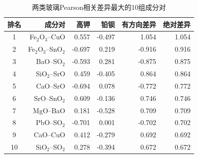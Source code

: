 \begin{table}[H]
  \centering
  \caption{两类玻璃Pearson相关差异最大的10组成分对}
  \label{tab:p4-differences}
  \small
  \begin{tabular}{crrrrr}
    \toprule
    排名 & 成分对 & 高钾 & 铅钡 & 有方向差异 & 绝对差异 \\
    \midrule
    1 & Fe$_2$O$_3$--CuO & 0.557 & -0.497 & 1.054 & 1.054 \\
    2 & Fe$_2$O$_3$--SnO$_2$ & -0.697 & 0.219 & -0.916 & 0.916 \\
    3 & BaO--SO$_2$ & -0.593 & 0.281 & -0.875 & 0.875 \\
    4 & SiO$_2$--SrO & 0.459 & -0.405 & 0.864 & 0.864 \\
    5 & CaO--SrO & -0.694 & 0.078 & -0.772 & 0.772 \\
    6 & SrO--SnO$_2$ & 0.609 & -0.136 & 0.746 & 0.746 \\
    7 & MgO--BaO & 0.181 & -0.528 & 0.709 & 0.709 \\
    8 & PbO--SO$_2$ & -0.701 & 0.001 & -0.702 & 0.702 \\
    9 & CaO--CuO & 0.412 & -0.279 & 0.692 & 0.692 \\
    10 & SiO$_2$--SO$_2$ & 0.278 & -0.394 & 0.672 & 0.672 \\
    \bottomrule
  \end{tabular}
\end{table}

